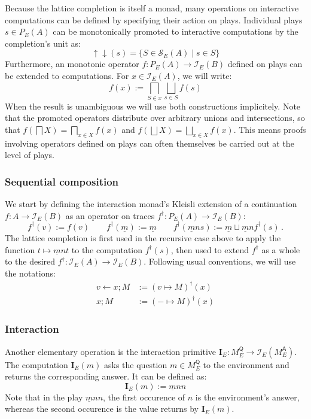 \documentclass[format=sigplan,authordraft]{acmart}
\newcommand{\kw}[1]{\ensuremath{ \mathsf{#1} }}
\begin{document}
Because the lattice completion is itself a monad,
many operations on interactive computations
can be defined by specifying their action on plays.
Individual plays $s \in P_E(A)$ can be monotonically promoted to
interactive computations by the completion's unit as:
\[
    {\uparrow \downarrow}(s) =
      \{ S \in \mathcal{S}_E(A) \mid s \in S \}
\]
Furthermore,
an monotonic operator $f : P_E(A) \rightarrow \mathcal{I}_E(B)$
defined on plays can be extended to computations.
For $x \in \mathcal{I}_E(A)$, we will write:
\[
  f(x) := \bigsqcap_{S \in x} \bigsqcup_{s \in S} f(s)
\]
When the result is unambiguous we will use both constructions
implicitely.
Note that the promoted operators
distribute over arbitrary unions and intersections, so that
$f(\bigsqcap X) = \bigsqcap_{x \in X} f(x)$ and
$f(\bigsqcup X) = \bigsqcup_{x \in X} f(x)$.
This means proofs involving operators defined on plays
can often themselves be carried out at the level of plays.

\subsubsection{Sequential composition}

We start by defining the interaction monad's Kleisli extension
of a continuation $f : A \rightarrow \mathcal{I}_E(B)$
as an operator on traces
$f^\dagger : P_E(A) \rightarrow \mathcal{I}_E(B)$:
\[
  f^\dagger(v) := f(v) \qquad
  f^\dagger(\underline{m}) := \underline{m} \qquad
  f^\dagger(\underline{m} n s) :=
    \underline{m} \sqcup \underline{m} n f^\dagger(s) \,.
\]
The lattice completion is first used in the recursive case above
to apply the function $t \mapsto \underline{m} n t$
to the computation $f^\dagger(s)$,
then used to extend $f^\dagger$ as a whole to the desired
$f^\dagger : \mathcal{I}_E(A) \rightarrow \mathcal{I}_E(B)$.
Following usual conventions, we will use the notations:
\begin{align*}
  v \leftarrow x ; M &:= (v \mapsto M)^\dagger(x) \\
  x ; M &:= ({-} \mapsto M)^\dagger(x)
\end{align*}

\subsubsection{Interaction}

Another elementary operation
is the interaction primitive
$\mathbf{I}_E : M_E^\kw{Q} \rightarrow \mathcal{I}_E(M_E^\kw{A})$.
The computation $\mathbf{I}_E(m)$
asks the question $m \in M_E^\kw{Q}$ to the environment
and returns the corresponding answer.
It can be defined as:
\[
    \mathbf{I}_E(m) := \underline{m} n n 
\]
Note that in the play $\underline{m} n n$,
the first occurence of $n$ is the environment's answer,
whereas the second occurence is the value returns by $\mathbf{I}_E(m)$.
\end{document}
